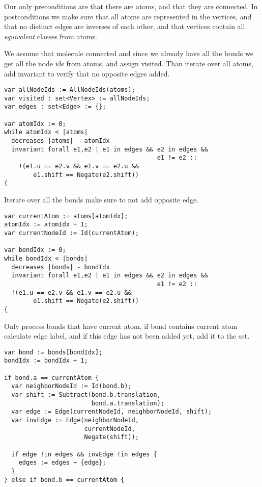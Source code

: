 Our only preconditions are that there are atoms, and that they are connected. In postconditions we make sure that all atoms are represented in the vertices, and that no distinct edges are inverses of each other, and that vertices contain all \textit{equivalent} classes from atoms.

We assume that molecule connected and since we already have all the bonds we get all the node ids from atoms, and assign visited. Than iterate over all atoms, add invariant to verify that no opposite edges added.

\begin{lstlisting}[caption={Outer loop},label={lst:invariant1}, literate={{forall}{forall}6 {exists}{exists}6}]
var allNodeIds := AllNodeIds(atoms);
var visited : set<Vertex> := allNodeIds;
var edges : set<Edge> := {};

var atomIdx := 0;
while atomIdx < |atoms|
  decreases |atoms| - atomIdx
  invariant forall e1,e2 | e1 in edges && e2 in edges &&
                                          e1 != e2 ::
    !(e1.u == e2.v && e1.v == e2.u &&
        e1.shift == Negate(e2.shift))
{
\end{lstlisting}

Iterate over all the bonds make sure to not add opposite edge.
\begin{lstlisting}[caption={Inner loop},label={lst:invariant2}, literate={{forall}{forall}6 {exists}{exists}6}]
var currentAtom := atoms[atomIdx];
atomIdx := atomIdx + 1;
var currentNodeId := Id(currentAtom);

var bondIdx := 0;
while bondIdx < |bonds|
  decreases |bonds| - bondIdx
  invariant forall e1,e2 | e1 in edges && e2 in edges &&
                                          e1 != e2 ::
  !(e1.u == e2.v && e1.v == e2.u &&
        e1.shift == Negate(e2.shift))
{
\end{lstlisting}

Only process bonds that have current atom, if bond contains current atom calculate edge label, and if this edge has not been added yet, add it to the set.
\begin{lstlisting}[caption={Inner loop, body},label={lst:invariant2}]
var bond := bonds[bondIdx];
bondIdx := bondIdx + 1;

if bond.a == currentAtom {
  var neighborNodeId := Id(bond.b);
  var shift := Subtract(bond.b.translation,
                        bond.a.translation);
  var edge := Edge(currentNodeId, neighborNodeId, shift);
  var invEdge := Edge(neighborNodeId,
                      currentNodeId,
                      Negate(shift));

  if edge !in edges && invEdge !in edges {
    edges := edges + {edge};
  }
} else if bond.b == currentAtom {
\end{lstlisting}

